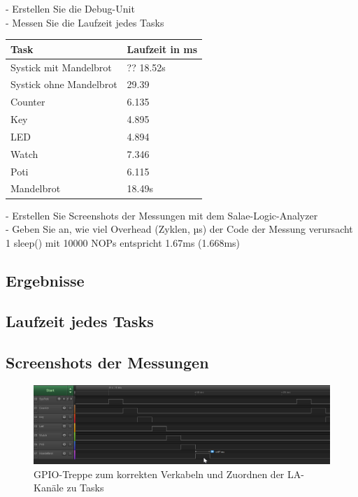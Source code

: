 \documentclass{article}
\begin{document}
-  Erstellen Sie die Debug-Unit \\
-  Messen Sie die Laufzeit jedes Tasks \\

	\begin{table}[h!]
		\begin{center}		
			\begin{tabular}{ l | l }	 %
				Task & Laufzeit in ms \\ \hline
				Systick mit Mandelbrot	& ?? 18.52s \\ \hline
				Systick ohne Mandelbrot	& 29.39 \\ \hline
				Counter	& 6.135 \\ \hline
				Key& 4.895 \\ \hline
				LED	& 4.894 \\ \hline
				Watch	& 7.346 \\ \hline
				Poti	& 6.115 \\ \hline
				Mandelbrot	& 18.49s \\ %
			\end{tabular}
		\end{center}		
	\end{table}

		
-  Erstellen Sie Screenshots der Messungen mit dem Salae-Logic-Analyzer \\
-  Geben Sie an, wie viel Overhead (Zyklen, µs) der Code der Messung verursacht \\
	1 sleep() mit 10000 NOPs entspricht 1.67ms (1.668ms) \\

\subsection{Ergebnisse}
\subsection{Laufzeit jedes Tasks}
\subsection{ Screenshots der Messungen }

	\begin{figure}[h!]
		\begin{center}
			\includegraphics[width=.8\textwidth]{tryGPIO}
			\caption{GPIO-Treppe zum korrekten Verkabeln und Zuordnen der LA-Kanäle zu Tasks}
		\end{center}
	\end{figure}
\end{document}
